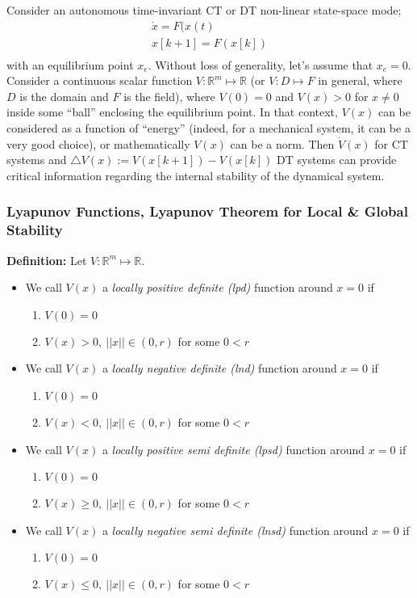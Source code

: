 \documentclass[twoside]{article}
\begin{document}
Consider an autonomous time-invariant CT or DT non-linear state-space mode;
%
\begin{align*}
    \dot{x} = F(x(t) \\
    x[k+1] = F(x[k]) \\
\end{align*}
%
with an equilibrium point $x_e$. Without loss of generality, let's assume that $x_e = 0$. Consider a continuous
scalar function $V : \mathbb{R}^{m} \mapsto \mathbb{R}$ (or  $V : D \mapsto F$ in general, where $D$ is the domain and $F$ is the field), where $V(0) = 0$ and $V(x) > 0$ for $x \neq 0$ inside some ``ball'' enclosing the equilibrium point. 
In that context, $V(x)$ can be considered as a function of ``energy'' (indeed, for a mechanical system, it can be a very good choice), or mathematically $V(x)$ can be a norm. Then $\dot{V}(x)$ for CT systems and $\triangle V(x) := V(x[k+1]) - V(x[k])$ 
DT systems can provide critical information regarding the internal stability of the dynamical system.

\subsubsection*{Lyapunov Functions, Lyapunov Theorem for Local \& Global Stability}

\textbf{Definition:} Let $V : \mathbb{R}^{m} \mapsto \mathbb{R}$. 
\begin{itemize}
\item We call $V(x)$ a \textit{locally positive definite (lpd)} function around $x = 0$ if 
\begin{enumerate}
    \item $V(0) = 0$
    \item $V(x) > 0, \ || x || \in (0 , r)$ for some $0 < r$
\end{enumerate}
%
\item We call $V(x)$ a \textit{locally negative definite (lnd)} function around $x = 0$ if 
\begin{enumerate}
    \item $V(0) = 0$
    \item $V(x) < 0, \ || x || \in (0 , r)$ for some $0 < r$
\end{enumerate}
%
%
\item We call $V(x)$ a \textit{locally positive semi definite (lpsd)} function around $x = 0$ if 
\begin{enumerate}
    \item $V(0) = 0$
    \item $V(x) \geq 0, \ || x || \in (0 , r)$ for some $0 < r$
\end{enumerate}
%
%
\item We call $V(x)$ a \textit{locally negative semi definite (lnsd)} function around $x = 0$ if 
\begin{enumerate}
    \item $V(0) = 0$
    \item $V(x) \leq 0, \ || x || \in (0 , r)$ for some $0 < r$
\end{enumerate}
%
\end{itemize}
\end{document}
